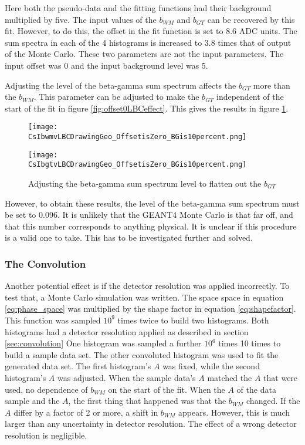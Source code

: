 \documentclass[../MaxHughesThesis.tex]{subfiles}
\begin{document}
Here both the pseudo-data and the fitting functions had their background multiplied by five. 
The input values of the $b_{WM}$ and $b_{GT}$ can be recovered by this fit.
However, to do this, the offset in the fit function is set to 8.6 ADC units.
The sum spectra in each of the 4 histograms is increased to 3.8 times that of output of the Monte Carlo.
These two parameters are not the input parameters.
The input offset was 0 and the input background level was 5.

Adjusting the level of the beta-gamma sum spectrum affects the $b_{GT}$ more than the $b_{WM}$.
This parameter can be adjusted to make the $b_{GT}$ independent of the start of the fit in figure \ref{fig:offset0LBCeffect}. 
This gives the results in figure \ref{fig:dataoffset0BG10per}. 

\begin{figure}
    \centering
    \begin{minipage}{0.50\textwidth}
        \centerline{\texttt{[image: CsIbwmvLBCDrawingGeo\_OffsetisZero\_BGis10percent.png]}}
    \end{minipage}\hfill
    \begin{minipage}{0.50\textwidth}
        \centerline{\texttt{[image: CsIbgtvLBCDrawingGeo\_OffsetisZero\_BGis10percent.png]}}
    \end{minipage}
    \caption{Adjusting the beta-gamma sum spectrum level to flatten out the $b_{GT}$}
    \label{fig:dataoffset0BG10per}
\end{figure}

However, to obtain these results, the level of the beta-gamma sum spectrum must be set to 0.096. 
It is unlikely that the GEANT4 Monte Carlo is that far off, and that this number corresponds to anything physical.
It is unclear if this procedure is a valid one to take.
This has to be investigated further and solved.

\subsubsection{The Convolution}

Another potential effect is if the detector resolution was applied incorrectly.
To test that, a Monte Carlo simulation was written.
The space space in equation \ref{eq:phase_space} was multiplied by the shape factor in equation \ref{eq:shapefactor}.
This function was sampled $10^{9}$ times twice to build two histograms. 
Both histograms had a detector resolution applied as described in section \ref{sec:convolution}
One histogram was sampled a further $10^{6}$ times 10 times to build a sample data set.
The other convoluted histogram was used to fit the generated data set.
The first histogram's $A$ was fixed, while the second histogram's $A$ was adjusted.
When the sample data's $A$ matched the $A$ that were used, no dependence of $b_{WM}$ on the start of the fit.
When the $A$ of the data sample and the $A$, the first thing that happened was that the $b_{WM}$ changed.
If the $A$ differ by a factor of 2 or more, a shift in $b_{WM}$ appears.
However, this is much larger than any uncertainty in detector resolution.
The effect of a wrong detector resolution is negligible. 
\end{document}
